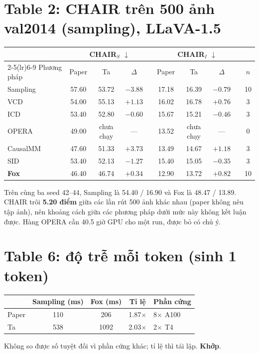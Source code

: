 \documentclass[10pt,a4paper]{article}
\newcommand{\ok}[1]{\textcolor{okc}{\textbf{#1}}}
\newcommand{\mute}[1]{\textcolor{mutec}{#1}}
\begin{document}
\section{Table 2: CHAIR trên 500 ảnh val2014 (sampling), LLaVA-1.5}
\begin{center}\small
\begin{tabular}{@{}lcccrcccr c@{}}
\toprule
& \multicolumn{4}{c}{CHAIR$_S$ $\downarrow$} & \multicolumn{4}{c}{CHAIR$_I$ $\downarrow$} & \\
\cmidrule(lr){2-5}\cmidrule(lr){6-9}
Phương pháp & Paper & Ta & $\Delta$ & & Paper & Ta & $\Delta$ & & $n$ \\
\midrule
Sampling & 57.60 & 53.72 & $-3.88$ & & 17.18 & 16.39 & $-0.79$ & & 10 \\
VCD & 54.00 & 55.13 & $+1.13$ & & 16.02 & 16.78 & $+0.76$ & & 3 \\
ICD & 53.40 & 52.80 & $-0.60$ & & 15.67 & 15.21 & $-0.46$ & & 3 \\
OPERA & 49.00 & \mute{chưa chạy} & --- & & 13.52 & \mute{chưa chạy} & --- & & 0 \\
CausalMM & 47.60 & 51.33 & $+3.73$ & & 13.49 & 14.67 & $+1.18$ & & 3 \\
SID & 53.40 & 52.13 & $-1.27$ & & 15.40 & 15.05 & $-0.35$ & & 3 \\
\textbf{Fox} & 46.40 & 46.74 & $+0.34$ & & 12.90 & 13.72 & $+0.82$ & & 10 \\
\bottomrule
\end{tabular}
\end{center}
\noindent\small Trên cùng ba seed 42--44, Sampling là 54.40 / 16.90 và Fox là 48.47 / 13.89. CHAIR trôi \textbf{5.20 điểm} giữa các lần rút 500 ảnh khác nhau (paper không nêu tập ảnh), nên khoảng cách giữa các phương pháp dưới mức này không kết luận được. Hàng OPERA cần 40.5 giờ GPU cho một run, được bỏ có chủ ý.



\section{Table 6: độ trễ mỗi token (sinh 1 token)}
\begin{center}\small
\begin{tabular}{@{}lcccl@{}}
\toprule
& Sampling (ms) & Fox (ms) & Tỉ lệ & Phần cứng \\
\midrule
Paper & 110 & 206 & 1.87$\times$ & 8$\times$ A100 \\
Ta & 538 & 1092 & 2.03$\times$ & 2$\times$ T4 \\
\bottomrule
\end{tabular}
\end{center}
\noindent\small Không so được số tuyệt đối vì phần cứng khác; tỉ lệ thì tái lập. \ok{Khớp}.
\end{document}
